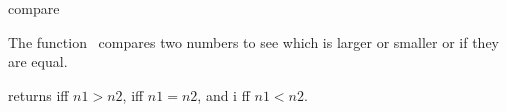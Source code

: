 \begin{ccRefFunction}{compare}

\ccDefinition

The function \ccRefName\ compares two numbers to see which is larger or
smaller or if they are equal.


{returns  iff $n1>n2$,  iff $n1=n2$, and  i
ff $n1<n2$.}


\end{ccRefFunction}
